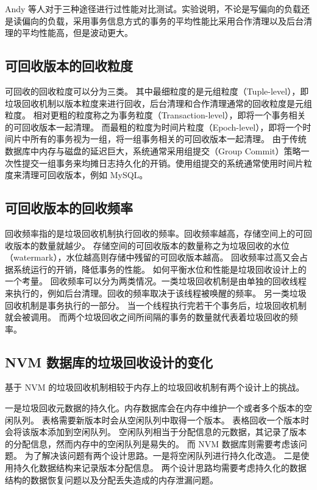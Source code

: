 Andy 等人对于三种途径进行过性能对比测试\cite{mvcc_evaluation}。实验说明，不论是写偏向的负载还是读偏向的负载，采用事务信息方式的事务的平均性能比采用合作清理以及后台清理的平均性能高，但是波动更大。


\subsection{可回收版本的回收粒度}

可回收的回收粒度可以分为三类。
其中最细粒度的是元组粒度（Tuple-level），即垃圾回收机制以版本粒度来进行回收，后台清理和合作清理通常的回收粒度是元组粒度。
相对更粗的粒度称之为事务粒度（Transaction-level），即将一个事务相关的可回收版本一起清理。
而最粗的粒度为时间片粒度（Epoch-level），即将一个时间片中所有的事务视为一组，将一组事务相关的可回收版本一起清理。
由于传统数据库中内存与磁盘的延迟巨大，系统通常采用组提交（Group Commit）策略一次性提交一组事务来均摊日志持久化的开销。使用组提交的系统通常使用时间片粒度来清理可回收版本，例如 MySQL。

\subsection{可回收版本的回收频率}

回收频率指的是垃圾回收机制执行回收的频率。回收频率越高，存储空间上的可回收版本的数量就越少。
存储空间的可回收版本的数量称之为垃圾回收的水位（watermark），水位越高则存储中残留的可回收版本越高。
回收频率过高又会占据系统运行的开销，降低事务的性能。
如何平衡水位和性能是垃圾回收设计上的一个考量。
回收频率可以分为两类情况。一类垃圾回收机制是由单独的回收线程来执行的，例如后台清理。回收的频率取决于该线程被唤醒的频率。
另一类垃圾回收机制是事务执行的一部分。
当一个线程执行完若干个事务后，垃圾回收机制就会被调用。
而两个垃圾回收之间所间隔的事务的数量就代表着垃圾回收的频率。


\subsection{NVM 数据库的垃圾回收设计的变化}

基于 NVM 的垃圾回收机制相较于内存上的垃圾回收机制有两个设计上的挑战。

一是垃圾回收元数据的持久化。内存数据库会在内存中维护一个或者多个版本的空闲队列。
表格需要新版本时会从空闲队列中取得一个版本。
表格回收一个版本时会将该版本添加到空闲队列。
空闲队列相当于分配信息的元数据，其记录了版本的分配信息，然而内存中的空闲队列是易失的。
而 NVM 数据库则需要考虑该问题。
为了解决该问题有两个设计思路。一是将空闲队列进行持久化改造。
二是使用持久化数据结构来记录版本分配信息。
两个设计思路均需要考虑持久化的数据结构的数据恢复问题以及分配丢失造成的内存泄漏问题。

